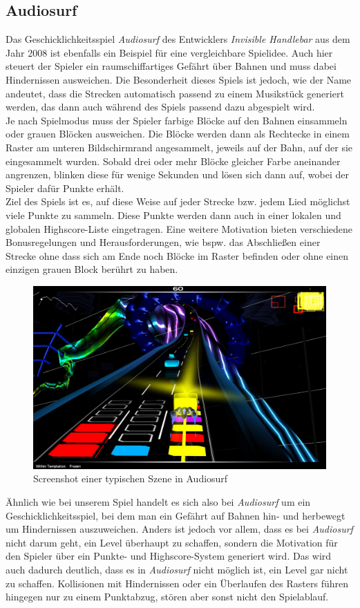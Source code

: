 \subsection{Audiosurf}

Das Geschicklichkeitsspiel \textit{Audiosurf} des Entwicklers \textit{Invisible Handlebar} aus dem Jahr 2008 ist ebenfalls ein Beispiel für eine vergleichbare Spielidee. Auch hier steuert der Spieler ein raumschiffartiges Gefährt über Bahnen und muss dabei Hindernissen ausweichen. Die Besonderheit dieses Spiels ist jedoch, wie der Name andeutet, dass die Strecken automatisch passend zu einem Musikstück generiert werden, das dann auch während des Spiels passend dazu abgespielt wird.\\
Je nach Spielmodus muss der Spieler farbige Blöcke auf den Bahnen einsammeln oder grauen Blöcken ausweichen. Die Blöcke werden dann als Rechtecke in einem Raster am unteren Bildschirmrand angesammelt, jeweils auf der Bahn, auf der sie eingesammelt wurden. Sobald drei oder mehr Blöcke gleicher Farbe aneinander angrenzen, blinken diese für wenige Sekunden und lösen sich dann auf, wobei der Spieler dafür Punkte erhält.\\
Ziel des Spiels ist es, auf diese Weise auf jeder Strecke bzw. jedem Lied möglichst viele Punkte zu sammeln. Diese Punkte werden dann auch in einer lokalen und globalen Highscore-Liste eingetragen. Eine weitere Motivation bieten verschiedene Bonusregelungen und Herausforderungen, wie bspw. das Abschließen einer Strecke ohne dass sich am Ende noch Blöcke im Raster befinden oder ohne einen einzigen grauen Block berührt zu haben.\\
\begin{figure}[ht]
\centering
\includegraphics[width=.7\textwidth]{gfx/recherche/audiosurf.jpg}
\caption{Screenshot einer typischen Szene in Audiosurf\footnotemark}
\end{figure}
Ähnlich wie bei unserem Spiel handelt es sich also bei \textit{Audiosurf} um ein Geschicklichkeitsspiel, bei dem man ein Gefährt auf Bahnen hin- und herbewegt um Hindernissen auszuweichen. Anders ist jedoch vor allem, dass es bei \textit{Audiosurf} nicht darum geht, ein Level überhaupt zu schaffen, sondern die Motivation für den Spieler über ein Punkte- und Highscore-System generiert wird. Das wird auch dadurch deutlich, dass es in \textit{Audiosurf} nicht möglich ist, ein Level gar nicht zu schaffen. Kollisionen mit Hindernissen oder ein Überlaufen des Rasters führen hingegen nur zu einem Punktabzug, stören aber sonst nicht den Spielablauf.